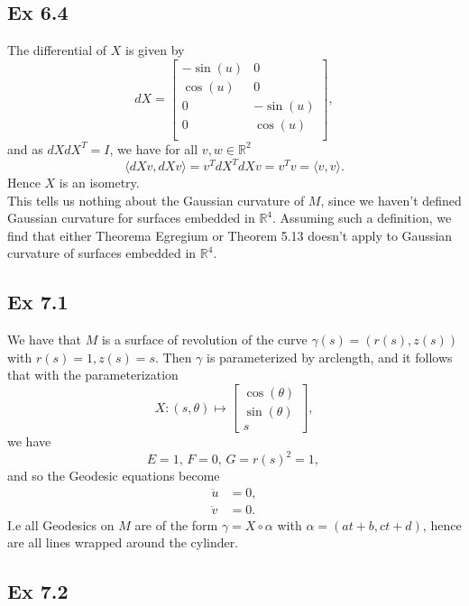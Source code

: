 \documentclass{article}
\theoremstyle{definition}
\newcommand{\R}{\mathbb{R}}
\begin{document}
\subsection*{Ex 6.4}

The differential of $X$ is given by
\[
	dX
	=
	\begin{bmatrix}
		-\sin(u) & 0 \\
		\cos(u) & 0 \\
		0 & -\sin(u) \\
		0 & \cos(u) \\
	\end{bmatrix},
\]
and as $dX dX^T = I$, we have for all $v, w \in \R^2$
\[
	\langle dX v, dX v \rangle
	=
	v^T dX^T dX v
	=
	v^T v
	=
	\langle v, v \rangle.
\] 
Hence $X$ is an isometry. \\

This tells us nothing about the Gaussian curvature of $M$, since we haven't
defined Gaussian curvature for surfaces embedded in $\R^4$. Assuming such a
definition, we find that either Theorema Egregium or Theorem 5.13 doesn't apply
to Gaussian curvature of surfaces embedded in $\R^4$. \\

\subsection*{Ex 7.1}

We have that $M$ is a surface of revolution of the curve $\gamma(s) = (r(s),
z(s))$ with $r(s) = 1, z(s) = s$. Then $\gamma$ is parameterized by arclength,
and it follows that with the parameterization
\[
	X : (s, \theta) \mapsto 
	\begin{bmatrix}
		\cos(\theta) \\
		\sin(\theta) \\
		s
	\end{bmatrix},
\] 
we have
\[
	E = 1, \,
	F = 0, \,
	G = r(s)^2 = 1, \,
\]
and so the Geodesic equations become
\begin{align*}
	\ddot u
	&=
	0, \\
	\ddot v
	&=
	0.
\end{align*}
I.e all Geodesics on $M$ are of the form $\gamma = X \circ \alpha$ with $\alpha
= (at + b, ct + d)$, hence are all lines wrapped around the cylinder.

\subsection*{Ex 7.2}
\end{document}
